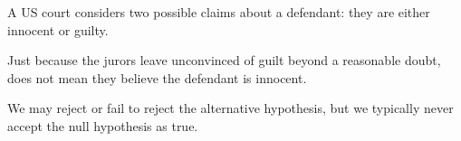 \documentclass{beamer}
\begin{document}
\begin{frame}
  \begin{example}
    A US court considers two possible claims about a defendant: they are either innocent or guilty.

    \vspace{1mm}
    \pause
  \end{example}\pause

  \begin{note}
    Just because the jurors leave unconvinced of guilt beyond a reasonable doubt, does not mean they believe the defendant is innocent.\pause

    \vspace{1mm}
    We may reject or fail to reject the alternative hypothesis, but we typically never accept the null hypothesis as true.
  \end{note}
\end{frame}
\end{document}
